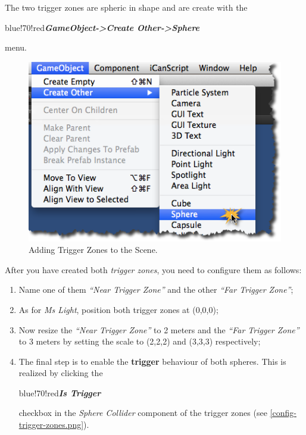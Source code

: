 The two trigger zones are spheric in shape and are create with the \begin{color}{blue!70!red}\emph{\textbf{GameObject->Create Other->Sphere}}\end{color} menu.

\begin{figure}[htbp]
\centering
\includegraphics[keepaspectratio,width=\textwidth,height=0.75\textheight]{adding-trigger-zones.png}
\caption{Adding Trigger Zones to the Scene.}
\label{adding-trigger-zones.png}
\end{figure}

After you have created both \emph{trigger zones}, you need to configure them as follows:

\begin{enumerate}
\item Name one of them \emph{``Near Trigger Zone''} and the other \emph{``Far Trigger Zone''};

\item As for \emph{Ms Light}, position both trigger zones at (0,0,0);

\item Now resize the \emph{``Near Trigger Zone''} to 2 meters and the \emph{``Far Trigger Zone''} to 3 meters by setting the scale to (2,2,2) and (3,3,3) respectively;

\item The final step is to enable the \textbf{trigger} behaviour of both spheres. This is realized by clicking the \begin{color}{blue!70!red}\emph{\textbf{Is Trigger}}\end{color} checkbox in the \emph{Sphere Collider} component of the trigger zones (see \ref{config-trigger-zones.png}).

\end{enumerate}

